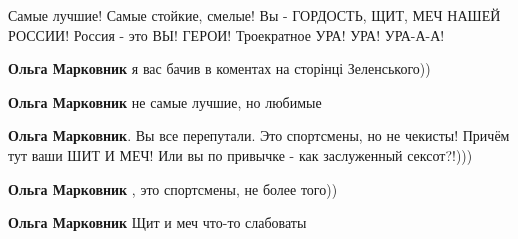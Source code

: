 \begin{itemize}
Самые лучшие! Самые стойкие, смелые! Вы - ГОРДОСТЬ, ЩИТ, МЕЧ НАШЕЙ РОССИИ!
Россия - это ВЫ! ГЕРОИ! Троекратное УРА! УРА! УРА-А-А!

\begin{itemize}
 

\textbf{Ольга Марковник} я вас бачив в коментах на сторінці Зеленського))

 
\textbf{Ольга Марковник} не самые лучшие, но любимые

 
\textbf{Ольга Марковник}. Вы все перепутали. Это спортсмены, но не чекисты! Причём тут ваши ШИТ И МЕЧ! Или вы по привычке - как заслуженный сексот?!)))

 
\textbf{Ольга Марковник} , это спортсмены, не более того))

 
\textbf{Ольга Марковник} Щит и меч что-то слабоваты

 

\end{itemize}
\end{itemize}
